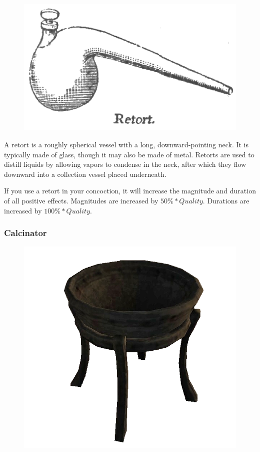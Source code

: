 \documentclass[12pt]{book}
\begin{document}
\begin{figure}
	\includegraphics[width=\textwidth]{retort.png}
\end{figure}

A retort is a roughly spherical vessel with a long, downward-pointing neck. It is typically made of glass, though it may also be made of metal. Retorts are used to distill liquids by allowing vapors to condense in the neck, after which they flow downward into a collection vessel placed underneath.

If you use a retort in your concoction, it will increase the magnitude and duration of all positive effects. Magnitudes are increased by $50\%*Quality$. Durations are increased by $100\%*Quality$.

\subsubsection{Calcinator}

\begin{figure}
	\includegraphics[width=\textwidth]{calcinator.png}
\end{figure}
\end{document}
